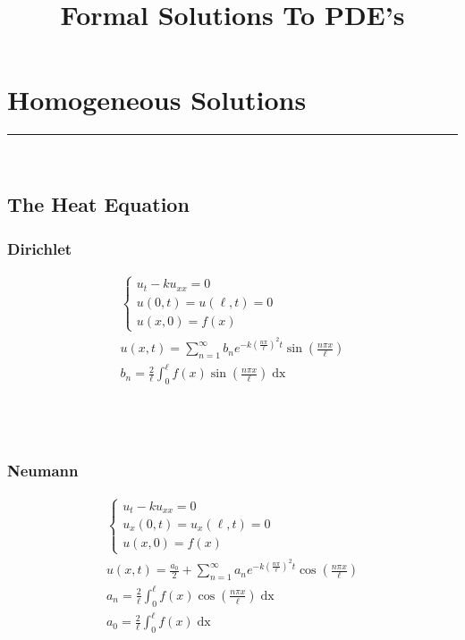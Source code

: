\documentclass{article}
\title{Formal Solutions To PDE's}
\date{}
\begin{document}
\maketitle
\section{Homogeneous Solutions}
\hrule
\noindent\\
\subsection{The Heat Equation}
\begin{minipage}{0.5\textwidth}
\subsubsection*{Dirichlet}
\begin{gather*}
\begin{cases}
u_{t} - ku_{xx} = 0\\
u(0,t) = u(\ell,t) = 0\\
u(x,0) = f(x)
\end{cases}\\
u(x,t) = \sum_{n=1}^{\infty}b_{n}e^{-k\left(\frac{n\pi}{\ell}\right)^{2}t}\sin{\left(\frac{n\pi x}{\ell}\right)}\\
b_{n} = \frac{2}{\ell}\int_{0}^{\ell}f(x)\sin{\left(\frac{n\pi x}{\ell}\right)}\mathop{dx}
\end{gather*}
\noindent\\\\\\
\end{minipage}
\begin{minipage}{0.5\textwidth}
\subsubsection*{Neumann}
\begin{gather*}
\begin{cases}
u_{t} - ku_{xx} = 0\\
u_{x}(0,t) = u_{x}(\ell,t) = 0\\
u(x,0) = f(x)
\end{cases}\\
u(x,t) = \frac{a_{0}}{2} + \sum_{n=1}^{\infty}a_{n}e^{-k\left(\frac{n\pi}{\ell}\right)^{2}t}\cos{\left(\frac{n\pi x}{\ell}\right)}\\
a_{n} = \frac{2}{\ell}\int_{0}^{\ell}f(x)\cos{\left(\frac{n\pi x}{\ell}\right)}\mathop{dx}\\
a_{0} = \frac{2}{\ell}\int_{0}^{\ell}f(x)\mathop{dx}\\
\end{gather*}
\end{minipage}
\end{document}
